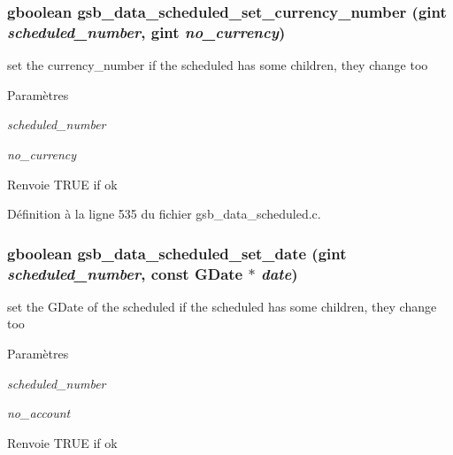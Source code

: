 \subsubsection[{gsb\_\-data\_\-scheduled\_\-set\_\-currency\_\-number}]{\setlength{\rightskip}{0pt plus 5cm}gboolean gsb\_\-data\_\-scheduled\_\-set\_\-currency\_\-number (gint {\em scheduled\_\-number}, \/  gint {\em no\_\-currency})}\label{gsb__data__scheduled_8c_a3825c62dc8b89912d6fe910f5190ab0e}
set the currency\_\-number if the scheduled has some children, they change too


\begin{DoxyParams}{Paramètres}
\item[{\em scheduled\_\-number}]\item[{\em no\_\-currency}]\end{DoxyParams}
\begin{DoxyReturn}{Renvoie}
TRUE if ok 
\end{DoxyReturn}


Définition à la ligne 535 du fichier gsb\_\-data\_\-scheduled.c.

\subsubsection[{gsb\_\-data\_\-scheduled\_\-set\_\-date}]{\setlength{\rightskip}{0pt plus 5cm}gboolean gsb\_\-data\_\-scheduled\_\-set\_\-date (gint {\em scheduled\_\-number}, \/  const GDate $\ast$ {\em date})}\label{gsb__data__scheduled_8c_a99a6e04b2a44d0050dd9c2028df91d6a}
set the GDate of the scheduled if the scheduled has some children, they change too


\begin{DoxyParams}{Paramètres}
\item[{\em scheduled\_\-number}]\item[{\em no\_\-account}]\end{DoxyParams}
\begin{DoxyReturn}{Renvoie}
TRUE if ok 
\end{DoxyReturn}


